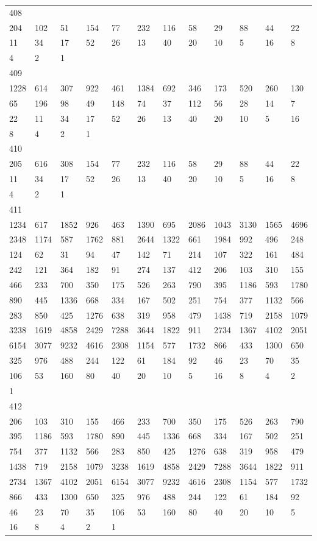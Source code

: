 \begin{longtable}{llllllllllll}
408&&&&&&&&&&&\\
204& 102& 51& 154& 77& 232& 116& 58& 29& 88& 44& 22\\
11& 34& 17& 52& 26& 13& 40& 20& 10& 5& 16& 8\\
4& 2& 1& \\

409&&&&&&&&&&&\\
1228& 614& 307& 922& 461& 1384& 692& 346& 173& 520& 260& 130\\
65& 196& 98& 49& 148& 74& 37& 112& 56& 28& 14& 7\\
22& 11& 34& 17& 52& 26& 13& 40& 20& 10& 5& 16\\
8& 4& 2& 1& \\

410&&&&&&&&&&&\\
205& 616& 308& 154& 77& 232& 116& 58& 29& 88& 44& 22\\
11& 34& 17& 52& 26& 13& 40& 20& 10& 5& 16& 8\\
4& 2& 1& \\

411&&&&&&&&&&&\\
1234& 617& 1852& 926& 463& 1390& 695& 2086& 1043& 3130& 1565& 4696\\
2348& 1174& 587& 1762& 881& 2644& 1322& 661& 1984& 992& 496& 248\\
124& 62& 31& 94& 47& 142& 71& 214& 107& 322& 161& 484\\
242& 121& 364& 182& 91& 274& 137& 412& 206& 103& 310& 155\\
466& 233& 700& 350& 175& 526& 263& 790& 395& 1186& 593& 1780\\
890& 445& 1336& 668& 334& 167& 502& 251& 754& 377& 1132& 566\\
283& 850& 425& 1276& 638& 319& 958& 479& 1438& 719& 2158& 1079\\
3238& 1619& 4858& 2429& 7288& 3644& 1822& 911& 2734& 1367& 4102& 2051\\
6154& 3077& 9232& 4616& 2308& 1154& 577& 1732& 866& 433& 1300& 650\\
325& 976& 488& 244& 122& 61& 184& 92& 46& 23& 70& 35\\
106& 53& 160& 80& 40& 20& 10& 5& 16& 8& 4& 2\\
1& \\

412&&&&&&&&&&&\\
206& 103& 310& 155& 466& 233& 700& 350& 175& 526& 263& 790\\
395& 1186& 593& 1780& 890& 445& 1336& 668& 334& 167& 502& 251\\
754& 377& 1132& 566& 283& 850& 425& 1276& 638& 319& 958& 479\\
1438& 719& 2158& 1079& 3238& 1619& 4858& 2429& 7288& 3644& 1822& 911\\
2734& 1367& 4102& 2051& 6154& 3077& 9232& 4616& 2308& 1154& 577& 1732\\
866& 433& 1300& 650& 325& 976& 488& 244& 122& 61& 184& 92\\
46& 23& 70& 35& 106& 53& 160& 80& 40& 20& 10& 5\\
16& 8& 4& 2& 1& \\


\end{longtable}
